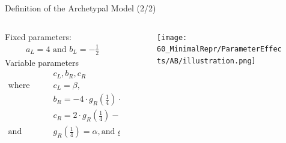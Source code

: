 \begin{frame}{Definition of the Archetypal Model (2/2)}
	\vspace{-1.5em}
	\begin{columns}
		\begin{column}{.7 \textwidth}
			Fixed parameters:
			\begin{align*}
				a_L = 4 \text{ and } b_L = -\frac{1}{2}
			\end{align*}
			Variable parameters
			\begin{align*}
				 & c_L, b_R, c_R                                                                                                           \\
				\text{where} \qquad
				 & c_L = \beta,                                                                                                            \\
				 & b_R = -4 \cdot g_R\left(\frac{1}{4}\right) + 4 \cdot g_R\left(\frac{1}{2}\right),                                       \\
				 & c_R = 2 \cdot g_R\left(\frac{1}{4}\right) - 1 \cdot g_R\left(\frac{1}{2}\right),                                        \\
				\text{and} \qquad
				 & g_R\left(\frac{1}{4}\right) = \alpha, \text{and } g_R\left(\frac{1}{2}\right) = \frac{1}{2} + \epsilon \text{ is fixed}
			\end{align*}
		\end{column}
		\begin{column}{.3 \textwidth}
			\begin{figure}
				\centering
				\texttt{[image: 60\_MinimalRepr/ParameterEffects/AB/illustration.png]}
			\end{figure}
		\end{column}
	\end{columns}
\end{frame}

